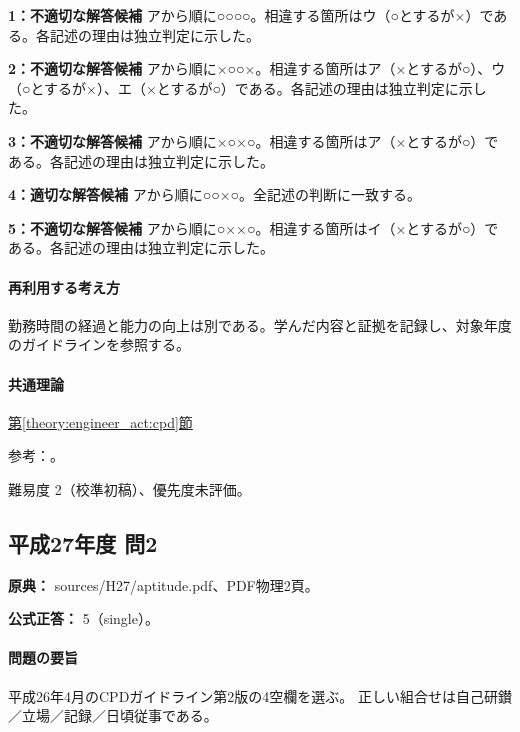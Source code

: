 \noindent\textbf{1：不適切な解答候補} アから順に○○○○。相違する箇所はウ（○とするが×）である。各記述の理由は独立判定に示した。\par

\noindent\textbf{2：不適切な解答候補} アから順に×○○×。相違する箇所はア（×とするが○）、ウ（○とするが×）、エ（×とするが○）である。各記述の理由は独立判定に示した。\par

\noindent\textbf{3：不適切な解答候補} アから順に×○×○。相違する箇所はア（×とするが○）である。各記述の理由は独立判定に示した。\par

\noindent\textbf{4：適切な解答候補} アから順に○○×○。全記述の判断に一致する。\par

\noindent\textbf{5：不適切な解答候補} アから順に○××○。相違する箇所はイ（×とするが○）である。各記述の理由は独立判定に示した。\par

\paragraph{再利用する考え方} 勤務時間の経過と能力の向上は別である。学んだ内容と証拠を記録し、対象年度のガイドラインを参照する。

\paragraph{共通理論} \hyperref[theory:engineer_act:cpd]{第\ref*{theory:engineer_act:cpd}節}

\par 参考：\cite{cpd_v1}。

\par 難易度 2（校準初稿）、優先度未評価。

\subsection{平成27年度 問2}
\label{q:h27-reg-apt-02}

\noindent\textbf{原典：} sources/H27/aptitude.pdf、PDF物理2頁。

\textbf{公式正答：} 5（single）。

\paragraph{問題の要旨} 平成26年4月のCPDガイドライン第2版の4空欄を選ぶ。 正しい組合せは自己研鑚／立場／記録／日頃従事である。

